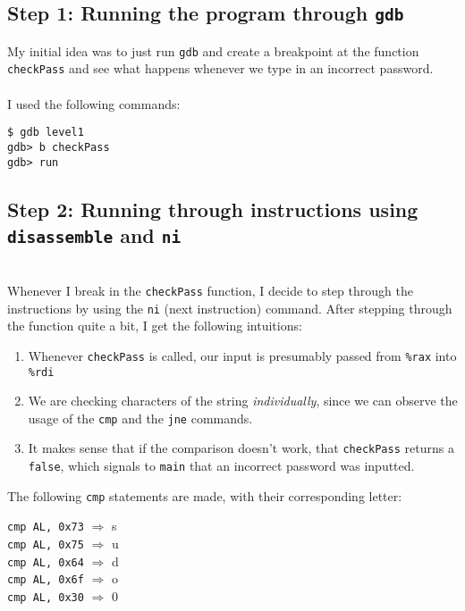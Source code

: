 \documentclass{report}
\begin{document}
\begin{sloppypar}
  \subsection{Step 1: Running the program through \texttt{gdb}}%
  \label{subsec:label}
  My initial idea was to just run \texttt{gdb} and create a breakpoint at
  the function \texttt{checkPass} and see what happens whenever we type
  in an incorrect password.
  \\ \\ I used the following commands:
  \begin{center}
    \texttt{\$ gdb level1} \\
    \texttt{gdb> b checkPass} \\
    \texttt{gdb> run}
  \end{center}
  \subsection{Step 2: Running through instructions using \texttt{disassemble} and \texttt{ni}  }%
  \label{subsec:label}
  \\ Whenever I break in the \texttt{checkPass} function, I decide
  to step through the instructions by using the \texttt{ni} (next instruction)
  command. After stepping through the function quite a bit, I get the following
  intuitions:
  \begin{enumerate}
    \item Whenever \texttt{checkPass} is called, our input is presumably
          passed from \texttt{\%rax} into \texttt{\%rdi}
    \item We are checking characters of the string \textit{individually},
          since we can observe the usage of the \texttt{cmp}  and the \texttt{jne} commands.
    \item It makes sense that if the comparison doesn't work, that \texttt{checkPass} returns a \texttt{false}, which signals to \texttt{main}
          that an incorrect password was inputted.
  \end{enumerate}
  The following \texttt{cmp} statements are made, with their corresponding
  letter:
  \begin{center}
    \texttt{cmp AL, 0x73} $\Rightarrow$ s \\
    \texttt{cmp AL, 0x75} $\Rightarrow$ u \\
    \texttt{cmp AL, 0x64} $\Rightarrow$ d \\
    \texttt{cmp AL, 0x6f} $\Rightarrow$ o \\
    \texttt{cmp AL, 0x30} $\Rightarrow$ 0 \\

\end{center}
\end{sloppypar}
\end{document}
